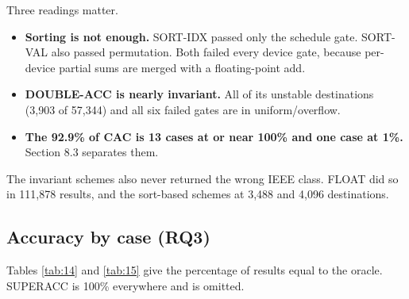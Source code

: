 \documentclass[3p,10pt]{elsarticle}
\begin{document}
Three readings matter.

\begin{itemize}
\item
  \textbf{Sorting is not enough.} SORT-IDX passed only the schedule
  gate. SORT-VAL also passed permutation. Both failed every device gate,
  because per-device partial sums are merged with a floating-point add.
\item
  \textbf{DOUBLE-ACC is nearly invariant.} All of its unstable
  destinations (3,903 of 57,344) and all six failed gates are in
  uniform/overflow.
\item
  \textbf{The 92.9\% of CAC is 13 cases at or near 100\% and one case at
  1\%.} Section 8.3 separates them.
\end{itemize}

The invariant schemes also never returned the wrong IEEE class. FLOAT
did so in 111,878 results, and the sort-based schemes at 3,488 and 4,096
destinations.

\hypertarget{accuracy-by-case-rq3}{%
\subsection{Accuracy by case (RQ3)}\label{accuracy-by-case-rq3}}

Tables \ref{tab:14} and \ref{tab:15} give the percentage of results
equal to the oracle. SUPERACC is 100\% everywhere and is omitted.
\end{document}

